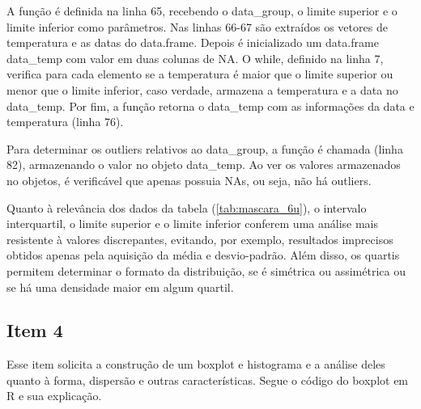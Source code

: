 \documentclass[a4paper, 12pt, titlepage]{article}
\begin{document}
A função é definida na linha 65, recebendo o data\_group, o limite superior e o limite inferior como parâmetros. Nas linhas 66-67 são extraídos os vetores de temperatura e as datas do data.frame. Depois é inicializado um data.frame data\_temp com valor em duas colunas de NA. O while, definido na linha 7, verifica para cada elemento se a temperatura é maior que o limite superior ou menor que o limite inferior, caso verdade, armazena a temperatura e a data no data\_temp. Por fim, a função retorna o data\_temp com as informações da data e temperatura (linha 76).

Para determinar os outliers relativos ao data\_group, a função é chamada (linha 82), armazenando o valor no objeto data\_temp. Ao ver os valores armazenados no objetos, é verificável que apenas possuia NAs, ou seja, não há outliers.

Quanto à relevância dos dados da tabela (\ref{tab:mascara_6u}), o intervalo interquartil, o limite superior e o limite inferior conferem uma análise mais resistente à valores discrepantes, evitando, por exemplo, resultados imprecisos obtidos apenas pela aquisição da média e desvio-padrão. Além disso, os quartis permitem determinar o formato da distribuição, se é simétrica ou assimétrica ou se há uma densidade maior em algum quartil.


\subsection*{Item 4}
Esse item solicita a construção de um boxplot e histograma e a análise deles quanto à forma, dispersão e outras características. Segue o código do boxplot em R e sua explicação.

\end{document}
